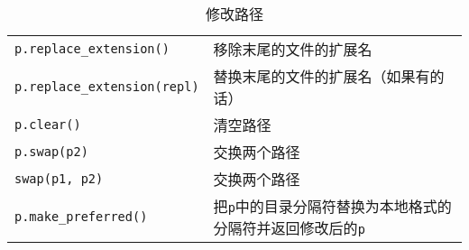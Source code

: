\begin{table}[ht]
\begin{tabular}{l|l}
        \texttt{p.replace\_extension()}     & 移除末尾的文件的扩展名                                            \\
        \texttt{p.replace\_extension(repl)} & 替换末尾的文件的扩展名（如果有的话）                                     \\
        \texttt{p.clear()}                  & 清空路径                                                   \\
        \texttt{p.swap(p2)}                 & 交换两个路径                                                 \\
        \texttt{swap(p1, p2)}               & 交换两个路径                                                 \\
        \texttt{p.make\_preferred()}        & 把\texttt{p}中的目录分隔符替换为本地格式的分隔符并返回修改后的\texttt{p}         \\
        \hline
    \end{tabular}
    \caption{修改路径}
    \label{t20.7}
\end{table}

